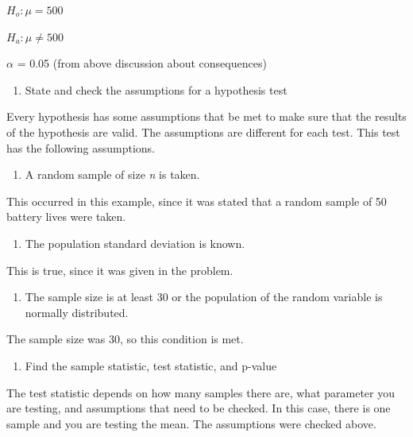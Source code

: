 \documentclass[
]{book}
\providecommand{\tightlist}{%
  \setlength{\itemsep}{0pt}\setlength{\parskip}{0pt}}
\begin{document}
\(H_o:\mu=500\)

\(H_a:\mu\ne500\)

\(\alpha\) = 0.05 (from above discussion about consequences)

\begin{enumerate}
\def\labelenumi{\arabic{enumi}.}
\setcounter{enumi}{2}
\tightlist
\item
  State and check the assumptions for a hypothesis test
\end{enumerate}

Every hypothesis has some assumptions that be met to make sure that the results of the hypothesis are valid. The assumptions are different for each test. This test has the following assumptions.

\begin{enumerate}
\def\labelenumi{\alph{enumi}.}
\tightlist
\item
  A random sample of size \emph{n} is taken.
\end{enumerate}

This occurred in this example, since it was stated that a random sample of 50 battery lives were taken.

\begin{enumerate}
\def\labelenumi{\alph{enumi}.}
\setcounter{enumi}{1}
\tightlist
\item
  The population standard deviation is known.
\end{enumerate}

This is true, since it was given in the problem.

\begin{enumerate}
\def\labelenumi{\alph{enumi}.}
\setcounter{enumi}{2}
\tightlist
\item
  The sample size is at least 30 or the population of the random variable is normally distributed.
\end{enumerate}

The sample size was 30, so this condition is met.

\begin{enumerate}
\def\labelenumi{\arabic{enumi}.}
\setcounter{enumi}{3}
\tightlist
\item
  Find the sample statistic, test statistic, and p-value
\end{enumerate}

The test statistic depends on how many samples there are, what parameter you are testing, and assumptions that need to be checked. In this case, there is one sample and you are testing the mean. The assumptions were checked above.
\end{document}
